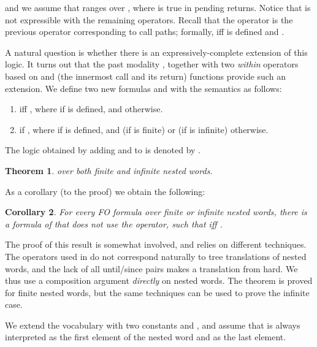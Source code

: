 \documentclass{LMCS}
\theoremstyle{plain}
\newtheorem{theorem}{Theorem}[section]
\newtheorem{corollary}[theorem]{Corollary}
\theoremstyle{definition}
\begin{document}
and we assume that  ranges over , 
where 
  is true in pending returns. Notice that  is not expressible
  with the remaining operators. Recall that the operator 
  is the previous operator corresponding to call paths; formally,
   iff  is defined and .

A natural question is whether there is an expressively-complete
extension of this logic. It turns out that the past modality
, together with two {\em within} operators
based on  and  (the innermost call and its return) functions
provide such an extension.  
We
define two new formulas  and  with the semantics as
follows: 

\begin{enumerate}[]

\item 
iff , where  if  is
defined, and  otherwise.

\item  if , 
where  if  is defined, and  (if  is
finite) or  (if  is infinite) otherwise. 
\end{enumerate}



The logic obtained by adding  and  to  is denoted by
. 

\begin{theorem}
\label{expcompl-one}
 over both finite and infinite nested words.
\end{theorem}

As a corollary (to the proof) we obtain the following: 

\begin{corollary}
For every FO formula  over finite or infinite nested words, there is a
formula  of  that does not use the 
operator, such that  iff .  
\end{corollary}

The proof of this result is somewhat involved, and
relies on different techniques. The operators used in  do not
correspond naturally to tree translations of nested words, and the
lack of all until/since pairs makes a translation from 
hard. We thus use a composition argument {\em directly} on nested
words. The theorem is proved for finite nested words, but 
the same techniques can be used to prove the infinite case. 

\renewcommand{\min}{{\rm min}}
\newcommand{\maxx}{{\rm max}}

We extend the vocabulary with two constants  and , and
assume that  is always interpreted as the first element of the
nested word and  as the last element. 
\end{document}

